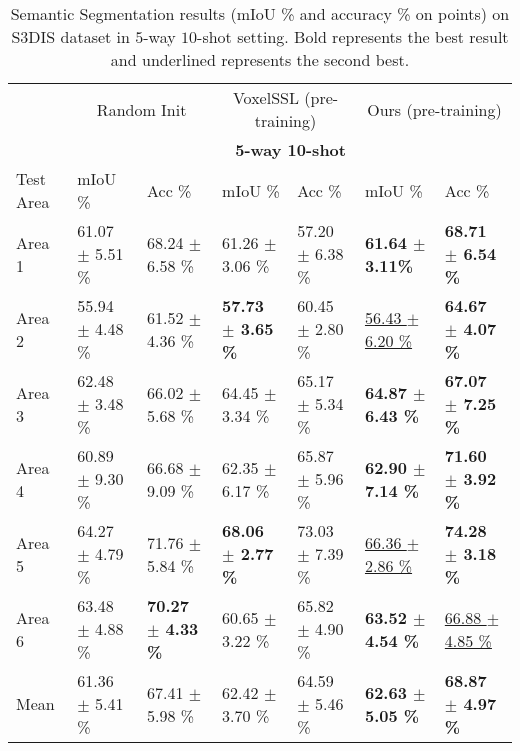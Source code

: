 \documentclass{article}
\begin{document}
\begin{table}[tbp]
	\caption{Semantic Segmentation results (mIoU \% and accuracy \% on points) on S3DIS dataset in $5$-way $10$-shot setting. Bold represents the best result and underlined represents the second best.}
	\label{semantic}
	\centering
	\scriptsize
	\begin{tabular}{lllllll}
		\toprule
		&  \multicolumn{2}{c}{Random Init} & \multicolumn{2}{c}{VoxelSSL (pre-training)} & \multicolumn{2}{c}{Ours (pre-training)}\\
		\cmidrule(r){2-7}
		& \multicolumn{6}{c}{\textbf{5-way 10-shot}}\\
		\cmidrule(r){2-7}
		Test Area & mIoU \% & Acc \% & mIoU \% & Acc \% & mIoU \% & Acc \% \\
		\midrule
		Area 1 & 61.07 $\pm$ 5.51 \% & 68.24 $\pm$ 6.58  \%& 61.26 $\pm$ 3.06 \% & 57.20 $\pm$ 6.38  \%& \textbf{61.64 $\pm$ 3.11\%} & \textbf{68.71 $\pm$ 6.54 \%}\\
		Area 2 & 55.94 $\pm$ 4.48 \% & 61.52 $\pm$ 4.36  \%& \textbf{57.73 $\pm$ 3.65 \%} & 60.45 $\pm$ 2.80  \%& \underline{56.43 $\pm$ 6.20 \%}& \textbf{64.67 $\pm$ 4.07  \%}\\
		Area 3 & 62.48 $\pm$ 3.48 \% & 66.02 $\pm$ 5.68 \%& 64.45 $\pm$ 3.34 \% & 65.17 $\pm$ 5.34 \%& \textbf{64.87 $\pm$ 6.43 \%}& \textbf{67.07 $\pm$ 7.25 \%}\\
		Area 4 & 60.89 $\pm$ 9.30 \% & 66.68 $\pm$ 9.09 \%& 62.35 $\pm$ 6.17 \% & 65.87 $\pm$ 5.96  \%& \textbf{62.90 $\pm$ 7.14 \%}& \textbf{71.60 $\pm$ 3.92 \%}\\
		Area 5 & 64.27 $\pm$ 4.79 \% & 71.76 $\pm$ 5.84 \%& \textbf{68.06 $\pm$ 2.77 \%} & 73.03 $\pm$ 7.39  \%& \underline{66.36 $\pm$ 2.86 \%}& \textbf{74.28 $\pm$ 3.18 \%}\\
		Area 6 & 63.48 $\pm$ 4.88 \% & \textbf{70.27 $\pm$ 4.33 \%}& 60.65 $\pm$ 3.22 \% & 65.82 $\pm$ 4.90  \%& \textbf{63.52 $\pm$ 4.54 \%}& \underline{66.88 $\pm$ 4.85 \%}\\
		Mean & 61.36 $\pm$ 5.41 \% & 67.41 $\pm$ 5.98 \%& 62.42 $\pm$ 3.70 \% & 64.59 $\pm$ 5.46 \%& \textbf{62.63 $\pm$ 5.05 \%}&  \textbf{68.87 $\pm$ 4.97 \%}\\
		\bottomrule
	\end{tabular}
\end{table}
\end{document}
